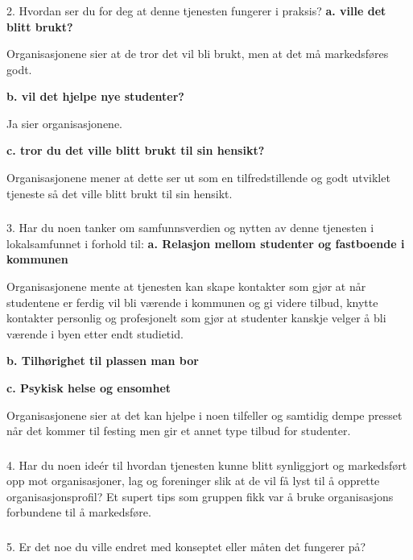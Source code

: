 \subsubsection{}{2. Hvordan ser du for deg at denne tjenesten fungerer i praksis?}
{\bf a. ville det blitt brukt?}

Organisasjonene sier at de tror det vil bli brukt, men at det må markedsføres godt.

{\bf b. vil det hjelpe nye studenter?}

Ja sier organisasjonene.

{\bf c. tror du det ville blitt brukt til sin hensikt?}

Organisasjonene mener at dette ser ut som en tilfredstillende og godt utviklet tjeneste så det ville blitt brukt til sin hensikt.

\subsubsection{}{3. Har du noen tanker om samfunnsverdien og nytten av denne tjenesten i lokalsamfunnet i forhold til:}
{\bf a. Relasjon mellom studenter og fastboende i kommunen}

Organisasjonene mente at tjenesten kan skape kontakter som gjør at når studentene er ferdig vil bli værende i kommunen og gi videre tilbud, knytte kontakter personlig og profesjonelt som gjør at studenter kanskje velger å bli værende i byen etter endt studietid.

{\bf b. Tilhørighet til plassen man bor}



{\bf c. Psykisk helse og ensomhet}

Organisasjonene sier at det kan hjelpe i noen tilfeller og samtidig dempe presset når det kommer til festing men gir et annet type tilbud for studenter.

\subsubsection{}{4. Har du noen ideér til hvordan tjenesten kunne blitt synliggjort og markedsført opp mot organisasjoner, lag og foreninger slik at de vil få lyst til å opprette organisasjonsprofil?}
Et supert tips som gruppen fikk var å bruke organisasjons forbundene til å markedsføre.

\subsubsection{}{5. Er det noe du ville endret med konseptet eller måten det fungerer på?}

